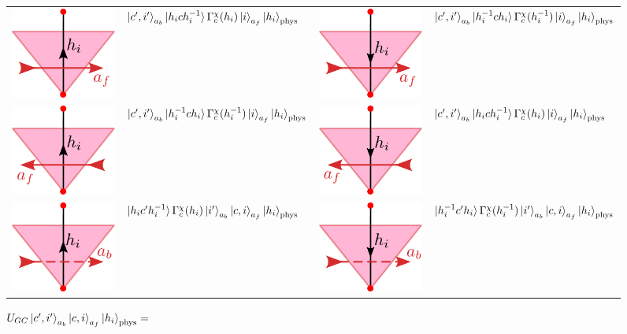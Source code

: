 \documentclass[two column]{article}
\begin{document}
\begin{figure}
\caption*{$U_{GC}\ket{c', i'}_{a_b} \ket{c, i}_{a_f}\ket{h_i}_{\text{phys}} = $}
\vspace{10pt}
	\begin{tabular}{llll}
 \includegraphics[width=0.12\linewidth]{Figures/IIRgf.pdf} &   $\ket{c', i'}_{a_b}\ket{h_i c h_i^{-1}} \Gamma^{\chi}_c(h_i)\ket{i}_{a_f}\ket{h_i}_{\text{phys}}$ &  \includegraphics[width=0.12\linewidth]{Figures/IIRif.pdf}           &       $\ket{c', i'}_{a_b}\ket{h_i^{-1} c h_i} \Gamma^{\chi}_c(h_i^{-1})\ket{i}_{a_f}\ket{h_i}_{\text{phys}}$                  \\ 
\includegraphics[width=0.12\linewidth]{Figures/IILif.pdf} &   $\ket{c', i'}_{a_b}\ket{h_i^{-1} c h_i} \Gamma^{\chi}_c(h_i^{-1})\ket{i}_{a_f}\ket{h_i}_{\text{phys}}$ &  \includegraphics[width=0.12\linewidth]{Figures/IILgf.pdf}           &       $\ket{c', i'}_{a_b}\ket{h_i c h_i^{-1}} \Gamma^{\chi}_c(h_i)\ket{i}_{a_f}\ket{h_i}_{\text{phys}}$                  \\  
 \includegraphics[width=0.12\linewidth]{Figures/IIRgb.pdf} &   $\ket{h_ic'h_i^{-1}}\Gamma_c^{\chi}(h_i)\ket{i'}_{a_b}\ket{c, i}_{a_f}\ket{h_i}_{\text{phys}}$  &  \includegraphics[width=0.12\linewidth]{Figures/IIRib.pdf}           &       $\ket{h_i^{-1}c'h_i}\Gamma_c^{\chi}(h_i^{-1})\ket{i'}_{a_b}\ket{c, i}_{a_f}\ket{h_i}_{\text{phys}}$                  \\ 

\end{tabular}
\end{figure}
\end{document}
